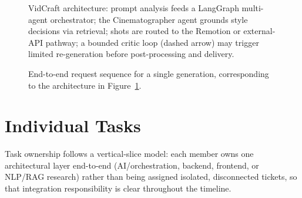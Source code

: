\documentclass[11pt,a4paper]{article}
\begin{document}
\begin{figure}[htbp]
\begin{tikzpicture}
\end{tikzpicture}
\caption{VidCraft architecture: prompt analysis feeds a LangGraph multi-agent orchestrator; the Cinematographer agent grounds style decisions via retrieval; shots are routed to the Remotion or external-API pathway; a bounded critic loop (dashed arrow) may trigger limited re-generation before post-processing and delivery.}
\label{fig:architecture}
\end{figure}

\begin{figure}[htbp]
\centering
{}
\caption{End-to-end request sequence for a single generation, corresponding to the architecture in Figure~\ref{fig:architecture}.}
\label{fig:sequence}
\end{figure}

\needspace{0.5\textheight}
\section{Individual Tasks}

Task ownership follows a vertical-slice model: each member owns one architectural layer end-to-end (AI/orchestration, backend, frontend, or NLP/RAG research) rather than being assigned isolated, disconnected tickets, so that integration responsibility is clear throughout the timeline.
\end{document}
